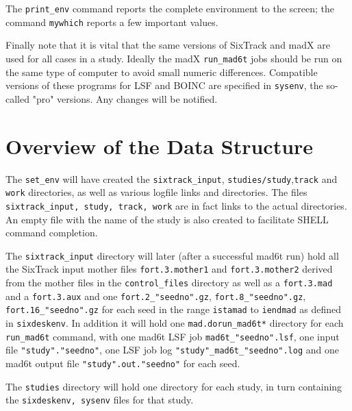 \documentclass{cernatsnote}    %
\begin{document}
The {\tt print\_env} command reports the complete environment to the screen;
the command {\tt mywhich} reports a few important values.

Finally note that it is vital that the same versions of SixTrack and madX are used for
all cases in a study. Ideally the madX {\tt run\_mad6t} jobs should be run on the
same type of computer to avoid small numeric differences. Compatible versions of these
programs for LSF and BOINC are specified
in {\tt sysenv}, the so-called "pro" versions. Any changes will
be notified.

\section{Overview of the Data Structure}
The {\tt set\_env} will have created the {\tt sixtrack\_input},
{\tt studies/study},{\tt track} and {\tt work} directories, as well
as various logfile links and directories. 
The files {\tt sixtrack\_input, study, track, work} are in fact
links to the actual directories. An empty file with the name of the study
is also created to facilitate SHELL command completion.     

The {\tt sixtrack\_input} directory will later (after a successful mad6t run)
hold all the SixTrack input 
mother files {\tt fort.3.mother1} and {\tt fort.3.mother2} derived from the mother files
in the {\tt control\_files} directory as well as a {\tt fort.3.mad} and a {\tt fort.3.aux}
and one {\tt fort.2\_"seedno".gz}, {\tt fort.8\_"seedno".gz}, 
{\tt fort.16\_"seedno".gz}
for each seed in the range {\tt istamad} to {\tt iendmad} as defined in
{\tt sixdeskenv}. In addition it will
hold one {\tt mad.dorun\_mad6t*} directory for each {\tt run\_mad6t} command,
with one mad6t LSF job {\tt mad6t\_"seedno".lsf}, one input file {\tt "study"."seedno"}, 
one LSF job log {\tt "study"\_mad6t\_"seedno".log} and one mad6t output file 
{\tt "study".out."seedno"} for each seed.

The {\tt studies} directory will hold one directory for each study, in turn
containing the {\tt sixdeskenv, sysenv} files for that study.
\end{document}
